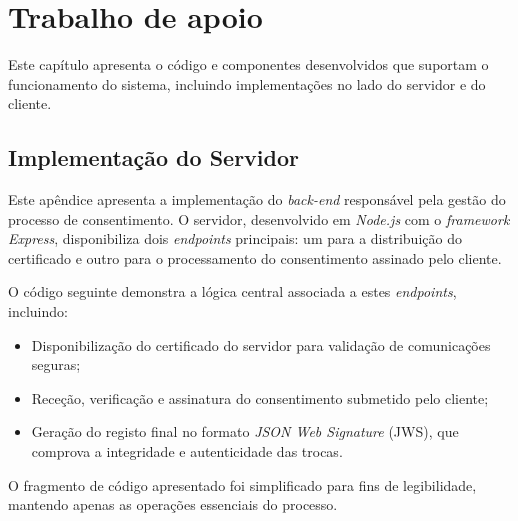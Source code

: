\chapter{Trabalho de apoio}

Este capítulo apresenta o código e componentes desenvolvidos que suportam o funcionamento do sistema, incluindo implementações no lado do servidor e do cliente.

\section{Implementação do Servidor}
\label{apendice:server-endpoints}
Este apêndice apresenta a implementação do \textit{back-end} responsável pela gestão do processo de consentimento.
O servidor, desenvolvido em \textit{Node.js} com o \textit{framework Express}, disponibiliza dois \textit{endpoints} principais:
um para a distribuição do certificado e outro para o processamento do consentimento assinado pelo cliente.

O código seguinte demonstra a lógica central associada a estes \textit{endpoints}, incluindo:
\begin{itemize}
    \item Disponibilização do certificado do servidor para validação de comunicações seguras;
    \item Receção, verificação e assinatura do consentimento submetido pelo cliente;
    \item Geração do registo final no formato \textit{JSON Web Signature} (JWS), que comprova a integridade e autenticidade das trocas.
\end{itemize}

O fragmento de código apresentado foi simplificado para fins de legibilidade, mantendo apenas as operações essenciais do processo.


